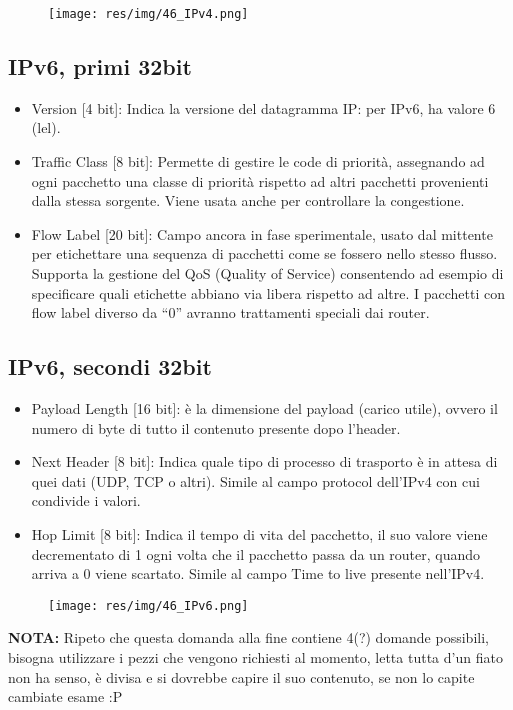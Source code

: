 \begin{figure}[H]
\centering
\texttt{[image: res/img/46\_IPv4.png]}
\end{figure}

\subsection{IPv6, primi 32bit}
\begin{itemize}
\item	Version [4 bit]: Indica la versione del datagramma IP: per IPv6, ha valore 6 (lel).
\item	Traffic Class [8 bit]: Permette di gestire le code di priorità, assegnando ad ogni pacchetto una classe di priorità rispetto ad altri pacchetti provenienti dalla stessa sorgente. Viene usata anche per controllare la congestione.
\item	Flow Label [20 bit]: Campo ancora in fase sperimentale, usato dal mittente per etichettare una sequenza di pacchetti come se fossero nello stesso flusso. Supporta la gestione del QoS (Quality of Service) consentendo ad esempio di specificare quali etichette abbiano via libera rispetto ad altre. I pacchetti con flow label diverso da “0” avranno trattamenti speciali dai router.
\end{itemize}
\subsection{IPv6, secondi 32bit}
\begin{itemize}
\item	Payload Length [16 bit]: è la dimensione del payload (carico utile), ovvero il numero di byte di tutto il contenuto presente dopo l'header.
\item	Next Header [8 bit]: Indica quale tipo di processo di trasporto è in attesa di quei dati (UDP, TCP o altri). Simile al campo protocol dell'IPv4 con cui condivide i valori.
\item	Hop Limit [8 bit]: Indica il tempo di vita del pacchetto, il suo valore viene decrementato di 1 ogni volta che il pacchetto passa da un router, quando arriva a 0 viene scartato. Simile al campo Time to live presente nell'IPv4.
\end{itemize}

\begin{figure}[H]
\centering
\texttt{[image: res/img/46\_IPv6.png]}
\end{figure}

\textbf{NOTA:} Ripeto che questa domanda alla fine contiene 4(?) domande possibili, bisogna utilizzare i pezzi che vengono richiesti al momento, letta tutta d'un fiato non ha senso, è divisa e si dovrebbe capire il suo contenuto, se non lo capite cambiate esame :P

